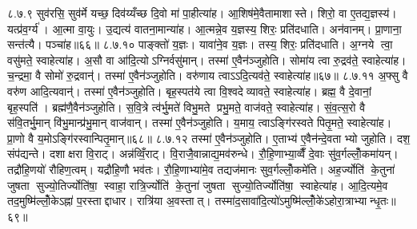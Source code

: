 ८.७.९
सुव॑रसि॒ सुव॑र्मे यच्छ॒ दिव॑य्यँच्छ दि॒वो मा॑ पा॒हीत्या॑ह। आ॒शिष॑मे॒वैतामाशास्ते। शिरो॒ वा ए॒तद्य॒ज्ञस्य॑। यत्प्र॑व॒र्ग्य॑। आ॒त्मा वा॒युः। उ॒द्यत्य॑ वातना॒मान्या॑ह। आ॒त्मन्ने॒व य॒ज्ञस्य॒ शिरः॒ प्रति॑दधाति। अन॑वानम्। प्रा॒णाना॒ सन्त॑त्यै। पञ्चा॑ह॥६६॥
८.७.१०
पाङ्क्तो॑ य॒ज्ञः। यावा॑ने॒व य॒ज्ञः। तस्य॒ शिरः॒ प्रति॑दधाति। अ॒ग्नये त्वा॒ वसु॑मते॒ स्वाहेत्या॑ह। अ॒सौ वा आ॑दि॒त्योऽग्निर्वसु॑मान्। तस्मा॑ ए॒वैन॑ञ्जुहोति। सोमा॑य त्वा रु॒द्रव॑ते॒ स्वाहेत्या॑ह। च॒न्द्रमा॒ वै सोमो॑ रु॒द्रवान्॑। तस्मा॑ ए॒वैन॑ञ्जुहोति। वरु॑णाय त्वाऽऽदि॒त्यव॑ते॒ स्वाहेत्या॑ह॥६७॥
८.७.११
अ॒फ्सु वै वरु॑ण आदि॒त्यवान्॑। तस्मा॑ ए॒वैन॑ञ्जुहोति। बृह॒स्पत॑ये त्वा वि॒श्वदेव्यावते॒ स्वाहेत्या॑ह। ब्रह्म॒ वै दे॒वानां॒ बृह॒स्पति॑। ब्रह्म॑णै॒वैन॑ञ्जुहोति। स॒वि॒त्रे त्व॑र्भु॒मते॑ विभु॒मते प्रभु॒मते॒ वाज॑वते॒ स्वाहेत्या॑ह। सं॒व॒त्स॒रो वै स॑वि॒तर्भु॒मान् वि॑भु॒मान्प्र॑भु॒मान् वाज॑वान्। तस्मा॑ ए॒वैन॑ञ्जुहोति। य॒माय॒ त्वाऽङ्गि॑रस्वते पितृ॒मते॒ स्वाहेत्या॑ह। प्रा॒णो वै य॒मोऽङ्गि॑रस्वान्पितृ॒मान्॥६८॥
८.७.१२
तस्मा॑ ए॒वैन॑ञ्जुहोति। ए॒ताभ्य॑ ए॒वैन॑न्दे॒वताभ्यो जुहोति। दश॒ संप॑द्यन्ते। दशाक्षरा वि॒राट्। अन्न॑व्विँ॒राट्। वि॒राजै॒वान्नाद्य॒मव॑रुन्धे। रौ॒हि॒णाभ्या॒व्वैँ दे॒वाः सु॑व॒र्गल्लोँ॒कमा॑यन्। तद्रौ॑हि॒णयो॑ रौहिण॒त्वम्। यद्रौ॑हि॒णौ भव॑तः। रौ॒हि॒णाभ्या॑मे॒व तद्यज॑मानः सुव॒र्गल्लोँ॒कमे॑ति। अह॒र्ज्योति॑ के॒तुना॑ जुषता सुज्यो॒तिर्ज्योति॑षा॒ स्वाहा॒ रात्रि॒र्ज्योति॑ के॒तुना॑ जुषता सुज्यो॒तिर्ज्योति॑षा॒ स्वाहेत्या॑ह। आ॒दि॒त्यमे॒व तद॒मुष्मि॑ल्लोँ॒केऽह्ना॑ प॒रस्ताद्दाधार। रात्रि॑या अ॒वस्तात्। तस्मा॑द॒सावा॑दि॒त्यो॑ऽमुष्मि॑ल्लोँ॒के॑ऽहोरा॒त्राभ्यान्धृ॒तः॥६९॥
\anuvakamend

